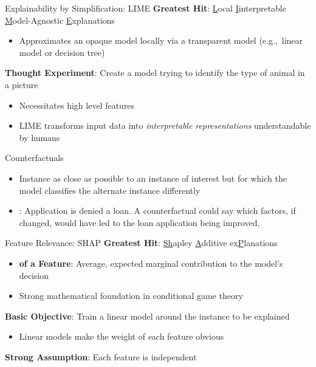 \documentclass[11pt,dvipsnames,usenames,aspectratio=169]{beamer}  %
\begin{document}
\begin{frame}{Explainability by Simplification: LIME}
  \noindent
  \textbf{Greatest Hit}: \underline{L}ocal \underline{I}interpretable \underline{M}odel-Agnostic \underline{E}xplanations~\citep{Ribeiro:2016}
  \begin{itemize}
    \item Approximates an opaque model locally via a transparent model (e.g.,~linear model or decision tree)
  \end{itemize}

  \vspace{18pt}
  \noindent
  \textbf{Thought Experiment}: Create a model trying to identify the type of animal in a picture
  \begin{itemize}
    \item Necessitates high level features
    \item LIME transforms input data into \textit{interpretable representations} understandable by humans
  \end{itemize}
\end{frame}

\begin{frame}{Counterfactuals}
  \begin{itemize}
    \setlength{\itemsep}{18pt}
    \item Instance as close as possible to an instance of interest but for which the model classifies the alternate instance differently

    \item \textit{}: Application is denied a loan.  A counterfactual could say which factors, if changed, would have led to the loan application being improved.
  \end{itemize}
\end{frame}

\begin{frame}{Feature Relevance: SHAP}
  \noindent
  \textbf{Greatest Hit}: \underline{Sh}apley \underline{A}dditive ex\underline{P}lanations~\citep{Lundberg:2017}
  \begin{itemize}
    \item \textbf{ of a Feature}: Average, expected marginal contribution to the model's decision
    \item Strong mathematical foundation in conditional game theory
  \end{itemize}

  \vspace{18pt}
  \noindent
  \textbf{Basic Objective}: Train a linear model around the instance to be explained
  \begin{itemize}
    \item Linear models make the weight of each feature obvious
  \end{itemize}

  \vspace{18pt}
  \noindent
  \textbf{Strong Assumption}: Each feature is independent
\end{frame}
\end{document}
